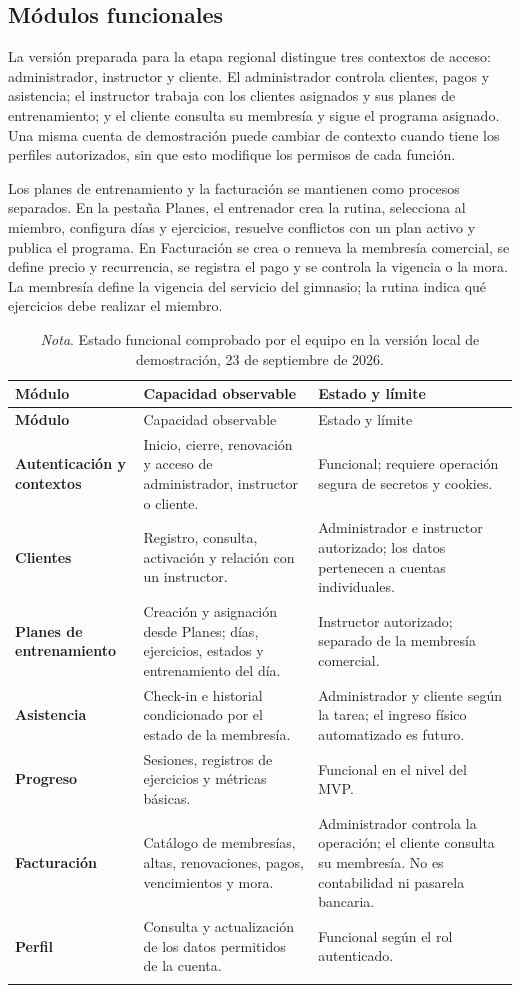 \subsection{Módulos funcionales}

La versión preparada para la etapa regional distingue tres contextos de acceso:
administrador, instructor y cliente. El administrador controla clientes, pagos y
asistencia; el instructor trabaja con los clientes asignados y sus planes de
entrenamiento; y el cliente consulta su membresía y sigue el programa asignado.
Una misma cuenta de demostración puede cambiar de contexto cuando tiene los
perfiles autorizados, sin que esto modifique los permisos de cada función.

Los planes de entrenamiento y la facturación se mantienen como procesos
separados. En la pestaña Planes, el entrenador crea la rutina, selecciona al
miembro, configura días y ejercicios, resuelve conflictos con un plan activo y
publica el programa. En Facturación se crea o renueva la membresía comercial, se
define precio y recurrencia, se registra el pago y se controla la vigencia o la
mora. La membresía define la vigencia del servicio del gimnasio; la rutina
indica qué ejercicios debe realizar el miembro.

\begin{longtable}{>{\bfseries}p{3.1cm}p{7.3cm}p{3.8cm}}
\caption{Estado de los módulos del MVP}\label{tab:modulos}\\
\toprule
Módulo & Capacidad observable & Estado y límite \\
\midrule
\endfirsthead
\toprule
Módulo & Capacidad observable & Estado y límite \\
\midrule
\endhead
Autenticación y contextos & Inicio, cierre, renovación y acceso de administrador, instructor o cliente. & Funcional; requiere operación segura de secretos y cookies. \\
Clientes & Registro, consulta, activación y relación con un instructor. & Administrador e instructor autorizado; los datos pertenecen a cuentas individuales. \\
Planes de entrenamiento & Creación y asignación desde Planes; días, ejercicios, estados y entrenamiento del día. & Instructor autorizado; separado de la membresía comercial. \\
Asistencia & Check-in e historial condicionado por el estado de la membresía. & Administrador y cliente según la tarea; el ingreso físico automatizado es futuro. \\
Progreso & Sesiones, registros de ejercicios y métricas básicas. & Funcional en el nivel del MVP. \\
Facturación & Catálogo de membresías, altas, renovaciones, pagos, vencimientos y mora. & Administrador controla la operación; el cliente consulta su membresía. No es contabilidad ni pasarela bancaria. \\
Perfil & Consulta y actualización de los datos permitidos de la cuenta. & Funcional según el rol autenticado. \\
\bottomrule
\caption*{\textit{Nota}. Estado funcional comprobado por el equipo en la versión local de demostración, 23 de septiembre de 2026.}
\end{longtable}

